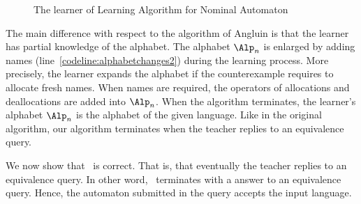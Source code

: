 \begin{figure}
\begin{algorithmic}[1]
  \end{algorithmic}
  \caption{The learner of Learning Algorithm for Nominal Automaton}\label{LANA_a3}	
\end{figure}
The main difference with respect to the algorithm of Angluin is that
the learner has partial knowledge of the alphabet.
%
The alphabet $\Alp_n$ is enlarged by adding names
(line~\ref{codeline:alphabetchanges2}) during the learning
process. More precisely, the learner expands the alphabet if the
counterexample requires to allocate fresh names.
%
When names are required, the operators of allocations and deallocations are added into $\Alp_n$. When the algorithm terminates, the learner's alphabet $\Alp_n$ is the
alphabet of the given language. Like in the original algorithm, our
algorithm terminates when the teacher replies  to an equivalence
query.

We now show that \nlstar\ is correct.
% 
That is, that eventually the teacher replies  to an equivalence query.
% 
In other word, \nlstar\ terminates with a  answer to an equivalence query.
% 
Hence, the automaton submitted in the query accepts the input language.

